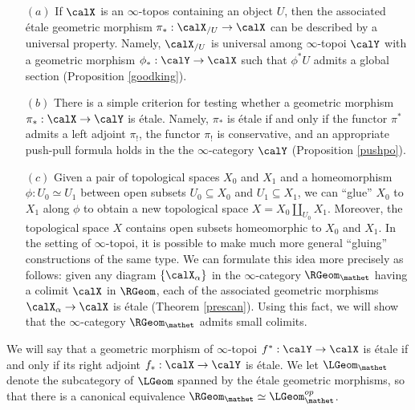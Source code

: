 \begin{itemize}
\item[$(a)$] If $\calX$ is an $\infty$-topos containing an object $U$, then the associated
\'{e}tale geometric morphism $\pi_{\ast}: \calX_{/U} \rightarrow \calX$ can be described by a
universal property. Namely, $\calX_{/U}$ is universal among $\infty$-topoi $\calY$
with a geometric morphism $\phi_{\ast}: \calY \rightarrow \calX$ such that
$\phi^{\ast} U$ admits a global section (Proposition \ref{goodking}). 

\item[$(b)$] There is a simple criterion for testing whether a geometric morphism
$\pi_{\ast}: \calX \rightarrow \calY$ is \'{e}tale. Namely, $\pi_{\ast}$ is \'{e}tale if and only if
the functor $\pi^{\ast}$ admits a left adjoint $\pi_{!}$, the functor $\pi_{!}$ is conservative, and an appropriate push-pull formula holds in the the $\infty$-category $\calY$ (Proposition \ref{pushpo}).

\item[$(c)$] Given a pair of topological spaces $X_0$ and $X_1$ and a homeomorphism
$\phi: U_0 \simeq U_1$ between open subsets $U_0 \subseteq X_0$ and $U_1 \subseteq X_1$,
we can ``glue'' $X_0$ to $X_1$ along $\phi$ to obtain a new topological space
$X = X_0 \coprod_{U_0} X_1$. Moreover, the topological space $X$ contains
open subsets homeomorphic to $X_0$ and $X_1$. In the setting of $\infty$-topoi, it is possible to make much more general ``gluing'' constructions of the same type. We can formulate this idea more precisely as follows: given any diagram $\{ \calX_{\alpha} \}$ in the $\infty$-category $\RGeom_{\mathet}$ having a colimit $\calX$ in $\RGeom$, each of the associated geometric morphisms $\calX_{\alpha} \rightarrow \calX$ is \'{e}tale (Theorem \ref{prescan}). Using this fact, we will show that the $\infty$-category $\RGeom_{\mathet}$ admits small colimits.
\end{itemize}

\begin{remark}
We will say that a geometric morphism of $\infty$-topoi $f^{\ast}: \calY \rightarrow \calX$ is
\'{e}tale if and only if its right adjoint $f_{\ast}: \calX \rightarrow \calY$ is \'{e}tale. We let
$\LGeom_{\mathet}$ denote the subcategory of $\LGeom$ spanned by the \'{e}tale geometric morphisms, so that there is a canonical equivalence $\RGeom_{\mathet} \simeq \LGeom_{\mathet}^{op}$.
\end{remark}


